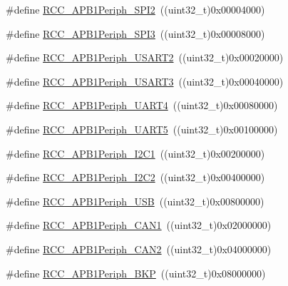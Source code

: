 \begin{DoxyCompactItemize}
\item 
\#define \mbox{\hyperlink{group___a_p_b1__peripheral_gaa21f1dfb4fcf241c6f85a048eaca29df}{R\+C\+C\+\_\+\+A\+P\+B1\+Periph\+\_\+\+S\+P\+I2}}~((uint32\+\_\+t)0x00004000)
\item 
\#define \mbox{\hyperlink{group___a_p_b1__peripheral_gabb0b40e839ef7403b086482e89d56f35}{R\+C\+C\+\_\+\+A\+P\+B1\+Periph\+\_\+\+S\+P\+I3}}~((uint32\+\_\+t)0x00008000)
\item 
\#define \mbox{\hyperlink{group___a_p_b1__peripheral_gaa69c77220b943a42a4bacb8a3bf87dd0}{R\+C\+C\+\_\+\+A\+P\+B1\+Periph\+\_\+\+U\+S\+A\+R\+T2}}~((uint32\+\_\+t)0x00020000)
\item 
\#define \mbox{\hyperlink{group___a_p_b1__peripheral_gaf72838a63d7d6200f251c1eb334cbaac}{R\+C\+C\+\_\+\+A\+P\+B1\+Periph\+\_\+\+U\+S\+A\+R\+T3}}~((uint32\+\_\+t)0x00040000)
\item 
\#define \mbox{\hyperlink{group___a_p_b1__peripheral_ga839d7ae3386622158210ecf53d9cd989}{R\+C\+C\+\_\+\+A\+P\+B1\+Periph\+\_\+\+U\+A\+R\+T4}}~((uint32\+\_\+t)0x00080000)
\item 
\#define \mbox{\hyperlink{group___a_p_b1__peripheral_gaa00c73f88a7af45fb29df97b07acd856}{R\+C\+C\+\_\+\+A\+P\+B1\+Periph\+\_\+\+U\+A\+R\+T5}}~((uint32\+\_\+t)0x00100000)
\item 
\#define \mbox{\hyperlink{group___a_p_b1__peripheral_ga594f87d504f7d63697d841033d1538f6}{R\+C\+C\+\_\+\+A\+P\+B1\+Periph\+\_\+\+I2\+C1}}~((uint32\+\_\+t)0x00200000)
\item 
\#define \mbox{\hyperlink{group___a_p_b1__peripheral_ga8eaeded403b5a2277fbfb3896c639416}{R\+C\+C\+\_\+\+A\+P\+B1\+Periph\+\_\+\+I2\+C2}}~((uint32\+\_\+t)0x00400000)
\item 
\#define \mbox{\hyperlink{group___a_p_b1__peripheral_ga69a1b3de9a59155bc8455eea5a15e3e4}{R\+C\+C\+\_\+\+A\+P\+B1\+Periph\+\_\+\+U\+SB}}~((uint32\+\_\+t)0x00800000)
\item 
\#define \mbox{\hyperlink{group___a_p_b1__peripheral_ga7f1d940739de0134ae89e9e04214989d}{R\+C\+C\+\_\+\+A\+P\+B1\+Periph\+\_\+\+C\+A\+N1}}~((uint32\+\_\+t)0x02000000)
\item 
\#define \mbox{\hyperlink{group___a_p_b1__peripheral_ga62801597b97816751c038acb1466179c}{R\+C\+C\+\_\+\+A\+P\+B1\+Periph\+\_\+\+C\+A\+N2}}~((uint32\+\_\+t)0x04000000)
\item 
\#define \mbox{\hyperlink{group___a_p_b1__peripheral_ga2a26b65d0e38030e414a9d39276645b1}{R\+C\+C\+\_\+\+A\+P\+B1\+Periph\+\_\+\+B\+KP}}~((uint32\+\_\+t)0x08000000)
\item 

\end{DoxyCompactItemize}
